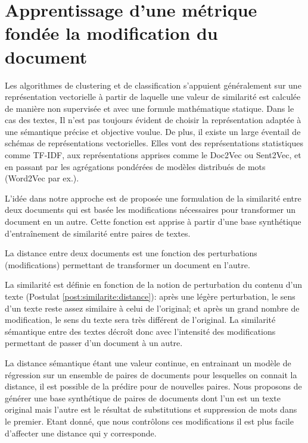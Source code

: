 \section{Apprentissage d'une métrique fondée la modification du document}
Les algorithmes de clustering et de classification s'appuient généralement sur une représentation vectorielle à partir de laquelle une valeur de similarité est calculée de manière non supervisée et avec une formule mathématique statique. Dans le cas des textes, Il n'est pas toujours évident de choisir la représentation adaptée à une sémantique précise et objective voulue. De plus, il existe un large éventail de schémas de représentations vectorielles. Elles vont des représentations statistiques comme TF-IDF, aux représentations apprises comme le Doc2Vec ou Sent2Vec, et en passant par les agrégations pondérées de modèles distribués de mots (Word2Vec par ex.). 

L'idée dans notre approche est de proposée une formulation de la similarité entre deux documents qui est basée les modifications nécessaires pour transformer un document en un autre. Cette fonction  est apprise à partir d'une base synthétique d'entraînement de similarité entre paires de textes. 
\begin{postulat}
La distance entre deux documents est une fonction des perturbations (modifications) permettant de transformer un document en l'autre. \label{post:similarite:distance}
\end{postulat}
La similarité est définie en fonction de la notion de perturbation du contenu d'un texte (Postulat \ref{post:similarite:distance}): après une légère perturbation, le sens d'un texte reste assez similaire à celui de l'original; et après un grand nombre de modification, le sens du  texte sera très différent de l'original. La similarité sémantique entre des textes décroît donc avec l'intensité des modifications permettant de passer d'un document à un autre. 

La distance sémantique étant une valeur continue, en entrainant un modèle de régression sur un ensemble de paires de documents pour lesquelles on connait la distance, il est possible de la prédire pour de nouvelles paires. Nous proposons de générer une base synthétique de paires de documents dont l'un est un texte original mais l'autre est le résultat de substitutions et suppression de mots dans le premier. Etant donné, que nous contrôlons ces modifications il est plus facile d'affecter une distance qui y corresponde.

